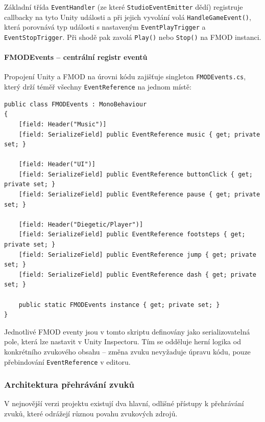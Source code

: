 Základní třída \texttt{EventHandler} (ze které \texttt{StudioEventEmitter} dědí) registruje callbacky na tyto Unity události a při jejich vyvolání volá \texttt{HandleGameEvent()}, která porovnává typ události s nastaveným \texttt{EventPlayTrigger} a \texttt{EventStopTrigger}. Při shodě pak zavolá \texttt{Play()} nebo \texttt{Stop()} na FMOD instanci.

\paragraph{FMODEvents -- centrální registr eventů}
Propojení Unity a FMOD na úrovni kódu zajišťuje singleton \texttt{FMODEvents.cs}, který drží téměř všechny \texttt{EventReference} na jednom místě:

\begin{lstlisting}[caption={FMODEvents -- centrální registr téměř všech FMOD eventů}, label={lst:fmodevents}]
public class FMODEvents : MonoBehaviour
{
    [field: Header("Music")]
    [field: SerializeField] public EventReference music { get; private set; }

    [field: Header("UI")]
    [field: SerializeField] public EventReference buttonClick { get; private set; }
    [field: SerializeField] public EventReference pause { get; private set; }

    [field: Header("Diegetic/Player")]
    [field: SerializeField] public EventReference footsteps { get; private set; }
    [field: SerializeField] public EventReference jump { get; private set; }
    [field: SerializeField] public EventReference dash { get; private set; }

    public static FMODEvents instance { get; private set; }
}
\end{lstlisting}

Jednotlivé FMOD eventy jsou v tomto skriptu definovány jako serializovatelná pole, která lze nastavit v Unity Inspectoru. Tím se odděluje herní logika od konkrétního zvukového obsahu -- změna zvuku nevyžaduje úpravu kódu, pouze přebindování \texttt{EventReference} v editoru.

\subsubsection{Architektura přehrávání zvuků}
\label{sec:architektura-prehravani}

V nejnovější verzi projektu existují dva hlavní, odlišné přístupy k přehrávání zvuků, které odrážejí různou povahu zvukových zdrojů.

